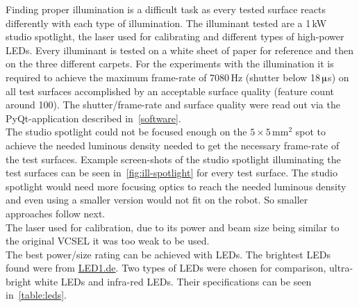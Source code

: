 \documentclass[12pt,a4paper]{article}
\begin{document}
Finding proper illumination is a difficult task as every tested surface reacts differently with each type of illumination.
The illuminant tested are a 1\,kW studio spotlight, the laser used for calibrating and different types of high-power LEDs.
Every illuminant is tested on a white sheet of paper for reference and then on the three different carpets.
For the experiments with the illumination it is required to achieve the maximum frame-rate of 7080\,Hz (shutter below 18\,$\muup$s) on all test surfaces accomplished by an acceptable surface quality (feature count around 100).
The shutter/frame-rate and surface quality were read out via the PyQt-application described in~\autoref{software}.\\
The studio spotlight could not be focused enough on the $5\times5$\,mm$^2$ spot to achieve the needed luminous density needed to get the necessary frame-rate of the test surfaces.
Example screen-shots of the studio spotlight illuminating the test surfaces can be seen in~\autoref{fig:ill-spotlight} for every test surface.
The studio spotlight would need more focusing optics to reach the needed luminous density and even using a smaller version would not fit on the robot.
So smaller approaches follow next.\\
The laser used for calibration, due to its power and beam size being similar to the original VCSEL it was too weak to be used.\\
The best power/size rating can be achieved with LEDs.
The brightest LEDs found were from \href{http://www.led1.de}{LED1.de}.
Two types of LEDs were chosen for comparison, ultra-bright white LEDs and infra-red LEDs.
Their specifications can be seen in~\autoref{table:leds}.
\end{document}
